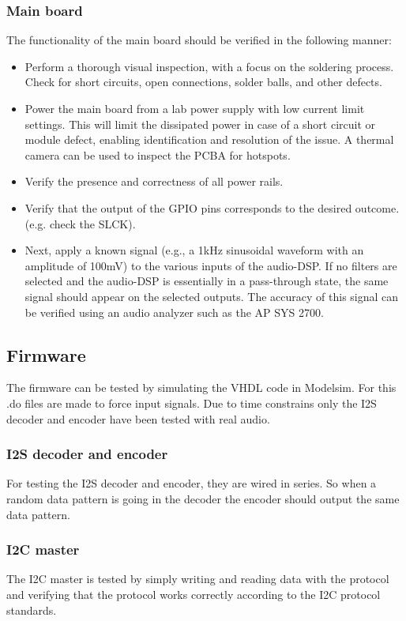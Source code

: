 \subsubsection{Main board}
The functionality of the main board should be verified in the following manner:
\begin{itemize}
\item Perform a thorough visual inspection, with a focus on the soldering process. Check for short circuits, open connections, solder balls, and other defects.
\item Power the main board from a lab power supply with low current limit settings. This will limit the dissipated power in case of a short circuit or module defect, enabling identification and resolution of the issue. A thermal camera can be used to inspect the PCBA for hotspots.
\item Verify the presence and correctness of all power rails.
\item Verify that the output of the GPIO pins corresponds to the desired outcome.(e.g. check the SLCK).
\item Next, apply a known signal (e.g., a 1kHz sinusoidal waveform with an amplitude of 100mV) to the various inputs of the audio-DSP. If no filters are selected and the audio-DSP is essentially in a pass-through state, the same signal should appear on the selected outputs. The accuracy of this signal can be verified using an audio analyzer such as the AP SYS 2700.
\end{itemize}  

\subsection{Firmware}
The firmware can be tested by simulating the VHDL code in Modelsim. For this .do files are made to force input signals. Due to time constrains only the I2S decoder and encoder have been tested with real audio. 

\subsubsection{I2S decoder and encoder}
For testing the I2S decoder and encoder, they are wired in series. So when a random data pattern is going in the decoder the encoder should output the same data pattern.

\subsubsection{I2C master}
The I2C master is tested by simply writing and reading data with the protocol and verifying that the protocol works correctly according to the I2C protocol standards. 

